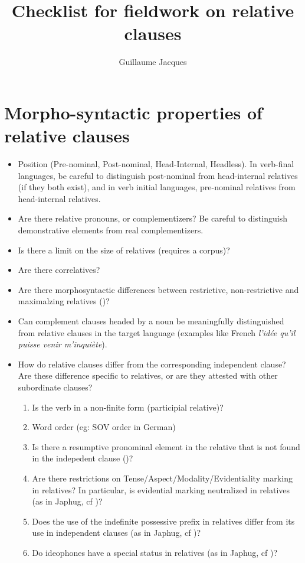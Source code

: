\documentclass[oldfontcommands,oneside,a4paper,11pt]{article}
\begin{document}
 
\title{Checklist for fieldwork on relative clauses}
\author{Guillaume Jacques}
\maketitle

\section{Morpho-syntactic properties of relative clauses}

\begin{itemize}
\item Position (Pre-nominal, Post-nominal, Head-Internal, Headless). In verb-final languages, be careful to distinguish post-nominal from head-internal relatives (if they both exist), and in verb initial languages, pre-nominal relatives from head-internal relatives.
\item Are there relative pronouns, or complementizers? Be careful to distinguish demonstrative elements from real complementizers.
\item Is there a limit on the size of relatives (requires a corpus)?
\item Are there correlatives?
\item Are there morphosyntactic differences between restrictive, non-restrictive and maximalzing relatives (\citealt{grosu98maximalizing})?
\item Can complement clauses headed by a noun be meaningfully distinguished from relative clauses in the target language (examples like French \textit{l'idée qu'il puisse venir m'inquiète}).
\item How do relative clauses differ from the corresponding independent clause? Are these difference specific to relatives, or are they attested with other subordinate clauses?
\begin{enumerate}
\item Is the verb in a non-finite form (participial relative)?
\item Word order (eg: SOV order in German)
\item Is there a resumptive pronominal element in the relative that is not found in the indepedent clause (\citealt{comrie81relative})?
\item Are there restrictions on Tense/Aspect/Modality/Evidentiality marking in relatives? In particular, is evidential marking neutralized in relatives (as in Japhug, cf \citealt{jacques16relatives})?
\item Does the use of the indefinite possessive prefix  in relatives differ from its use in independent clauses (as in Japhug, cf \citealt{jacques16relatives})?
\item Do ideophones have a special status in relatives (as in Japhug, cf \citealt[275]{japhug14ideophones})?
\end{enumerate}
\end{itemize}
\end{document}
